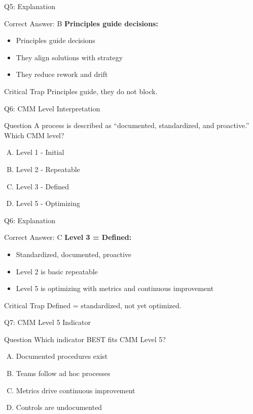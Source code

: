 \documentclass{beamer}
\begin{document}
	\begin{frame}{Q5: Explanation}
		\begin{block}{Correct Answer: B}
			\textbf{Principles guide decisions:}
			\begin{itemize}
				\item Principles guide decisions
				\item They align solutions with strategy
				\item They reduce rework and drift
			\end{itemize}
		\end{block}
		\begin{alertblock}{Critical Trap}
			Principles guide, they do not block.
		\end{alertblock}
	\end{frame}
	
	\begin{frame}{Q6: CMM Level Interpretation}
		\begin{block}{Question}
			A process is described as ``documented, standardized, and proactive.'' Which CMM level?
		\end{block}
		\begin{enumerate}[(A)]
			\item Level 1 - Initial
			\item Level 2 - Repeatable
			\item Level 3 - Defined
			\item Level 5 - Optimizing
		\end{enumerate}
	\end{frame}
	
	\begin{frame}{Q6: Explanation}
		\begin{block}{Correct Answer: C}
			\textbf{Level 3 = Defined:}
			\begin{itemize}
				\item Standardized, documented, proactive
				\item Level 2 is basic repeatable
				\item Level 5 is optimizing with metrics and continuous improvement
			\end{itemize}
		\end{block}
		\begin{alertblock}{Critical Trap}
			Defined = standardized, not yet optimized.
		\end{alertblock}
	\end{frame}
	
	\begin{frame}{Q7: CMM Level 5 Indicator}
		\begin{block}{Question}
			Which indicator BEST fits CMM Level 5?
		\end{block}
		\begin{enumerate}[(A)]
			\item Documented procedures exist
			\item Teams follow ad hoc processes
			\item Metrics drive continuous improvement
			\item Controls are undocumented
		\end{enumerate}
	\end{frame}
	
\end{document}
